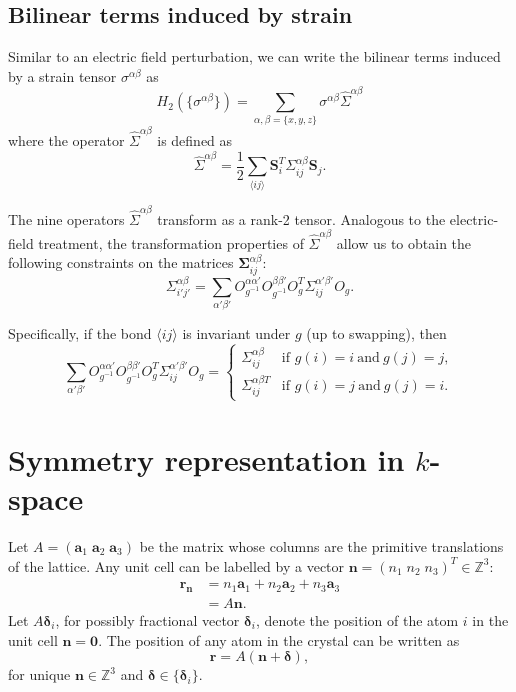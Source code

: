 \documentclass[12pt, a4paper]{article}
\newcommand{\mat}[1]{\bm{\mathit{#1}}}
\begin{document}
\subsection{Bilinear terms induced by strain}
Similar to an electric field perturbation, we can write the bilinear terms induced by a strain tensor $\sigma^{\alpha \beta}$ as
\begin{equation}
  H_2(\{\sigma^{\alpha\beta}\})=\sum_{\alpha,\beta=\{x,y,z\}}\sigma^{\alpha\beta}\hat{\Sigma}^{\alpha\beta}
\end{equation}
where the operator $\hat{\Sigma}^{\alpha\beta}$ is defined as
\begin{equation}
   \hat{\Sigma}^{\alpha\beta}= \frac{1}{2}\sum_{\langle ij\rangle}\bm{S}_i^T \mat{\Sigma}^{\alpha\beta}_{ij}\bm{S}_j.
\end{equation}

The nine operators $\hat{\Sigma}^{\alpha\beta}$ transform as a rank-2 tensor. Analogous to the electric-field treatment, the transformation properties of $\hat{\Sigma}^{\alpha\beta}$ allow us to obtain the following constraints on the matrices $\bm{\Sigma}_{ij}^{\alpha\beta}$:
\begin{equation}
  \mat{\Sigma}_{i'j'}^{\alpha\beta}=\sum_{\alpha'\beta'}O_{g^{-1}}^{\alpha\alpha'}O_{g^{-1}}^{\beta\beta'}\mat{O}_g^T \mat{\Sigma}^{\alpha'\beta'}_{ij}\mat{O}_g.
\end{equation}

Specifically, if the bond $\langle ij\rangle$ is invariant under $g$ (up to swapping), then
\begin{equation}
 \sum_{\alpha'\beta'}O_{g^{-1}}^{\alpha\alpha'}O_{g^{-1}}^{\beta\beta'}\mat{O}_g^T \mat{\Sigma}^{\alpha'\beta'}_{ij}\mat{O}_g= \begin{cases}
    \mat{\Sigma}_{ij}^{\alpha\beta}&\textrm{if }g(i)=i~\textrm{and}~g(j)=j,\\
    \mat{\Sigma}_{ij}^{\alpha \beta T}&\textrm{if }g(i)=j~\textrm{and}~g(j)=i.
 \end{cases}
\end{equation}

\section{Symmetry representation in $k$-space}
Let $A=(\bm{a}_1\;\bm{a}_2\;\bm{a}_3)$ be the matrix whose columns are the primitive translations of the lattice. Any unit cell can be labelled by a vector $\bm{n}={(n_1\;n_2\;n_3)}^T\in\mathbb{Z}^{3}$:
\begin{align}
\bm{r}_{\bm{n}} &= n_1\bm{a}_1+n_2\bm{a}_2+n_3\bm{a}_3\\
  &= A\bm{n}.
\end{align}
Let $A\bm{\delta}_i$, for possibly fractional vector $\bm{\delta}_i$, denote the position of the atom $i$ in the unit cell $\bm{n}=\bm{0}$. The position of any atom in the crystal can be written as
\begin{equation}
  \bm{r}=\mat{A}(\bm{n}+\bm{\delta}),
\end{equation}
for unique $\bm{n}\in\mathbb{Z}^{3}$ and $\bm{\delta}\in\{\bm{\delta}_i\}$.
\end{document}
